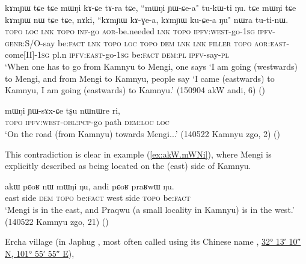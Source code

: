 \begin{exe}
\ex \label{ex:kAmYW.mWNi}
\gll kɤmɲɯ tɕe tɕe mɯŋi kɤ-ɕe tɤ-ra tɕe, ``mɯŋi ɲɯ-ɕe-a" tu-kɯ-ti ŋu.
tɕe mɯŋi tɕe kɤmɲɯ nɯ tɕe tɕe, nɤki, ``kɤmɲɯ kɤ-ɣe-a, kɤmɲɯ ku-ɕe-a ŋu" nɯra tu-ti-nɯ. \\
\textsc{topo} \textsc{loc} \textsc{lnk}  \textsc{topo} \textsc{inf}-go \textsc{aor}-be.needed \textsc{lnk}  \textsc{topo} \textsc{ipfv}:\textsc{west}-go-\textsc{1sg} \textsc{ipfv}-\textsc{genr}:S/O-say be:\textsc{fact} \textsc{lnk}  \textsc{topo} \textsc{loc}  \textsc{topo} \textsc{dem} \textsc{lnk} \textsc{lnk} \textsc{filler}  \textsc{topo} \textsc{aor}:\textsc{east}-come[II]-\textsc{1sg} pl.n \textsc{ipfv}:\textsc{east}-go-\textsc{1sg} be:\textsc{fact} \textsc{dem}:\textsc{pl} \textsc{ipfv}-say-\textsc{pl} \\
\glt `When one has to go from Kamnyu to Mengi, one says `I am going (westwards) to Mengi, and from Mengi to Kamnyu, people say `I came (eastwards)  to Kamnyu, I am going (eastwards) to Kamnyu.' (150904 akW andi, 6)
()
\end{exe}

\begin{exe}
\ex \label{ex:mWNi.YWsAxCe}
\gll mɯŋi ɲɯ-sɤx-ɕe tʂu nɯnɯre ri, \\
\textsc{topo} \textsc{ipfv}:\textsc{west}-\textsc{obl}:\textsc{pcp}-go path \textsc{dem}:\textsc{loc} \textsc{loc} \\
\glt `On the road (from Kamnyu) towards Mengi...' (140522 Kamnyu zgo, 2) ()
\end{exe}

This contradiction is clear in example (\ref{ex:akW.mWNi}), where Mengi is explicitly described as being located on the  (east) side of Kamnyu.

\begin{exe}
\ex \label{ex:akW.mWNi}
\gll akɯ pɕoʁ nɯ mɯŋi ŋu, andi pɕoʁ praʁwɯ ŋu. \\
 east side \textsc{dem}  \textsc{topo} be:\textsc{fact} west side  \textsc{topo} be:\textsc{fact} \\
\glt `Mengi is in the east, and Praqwu (a small locality in Kamnyu) is in the west.' (140522 Kamnyu zgo, 21) ()
\end{exe}

Ercha village (in Japhug , most often called using its Chinese name  , \href{https://geohack.toolforge.org/geohack.php?params=32.219530245125554_N_101.93203109826473_E}{32° 13′ 10″ N, 101° 55′ 55″ E}), 

